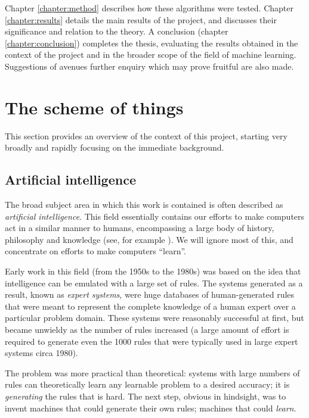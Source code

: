 Chapter \ref{chapter:method} describes how these algorithms were
tested.  Chapter \ref{chapter:results} details the main results of the
project, and discusses their significance and relation to the theory.
A conclusion (chapter \ref{chapter:conclusion}) completes the thesis, 
evaluating the results obtained in the context of the project and in
the broader scope of the field of machine learning.  Suggestions of
avenues further enquiry which may prove fruitful are also made.

\section{The scheme of things}

This section provides an overview of the context of this project,
starting very broadly and rapidly focusing on the immediate
background. 


\subsection{Artificial intelligence}

The broad subject area in which this work is contained is often
described as \emph{artificial intelligence}.  This field 
essentially contains our efforts to make computers act in a similar
manner to humans, encompassing a large body of history, philosophy and
knowledge (see, for example \cite{Penrose89}).  We will ignore most
of this, and concentrate on efforts to make computers ``learn''.

Early work in this field (from the 1950s to the 1980s) was based on
the idea that intelligence can be emulated with a large set of rules.
The systems generated as a result, known as \emph{expert systems},
were huge databases of human-generated rules that were meant to
represent the complete knowledge of a human expert over a particular
problem domain.  These systems were reasonably successful at first,
but became unwieldy as the number of rules increased (a large amount
of effort is required to generate even the 1000 rules that were
typically used in large expert systems circa 1980). 

The problem was more practical than theoretical: systems with large
numbers of rules can theoretically learn any learnable problem to a
desired accuracy; it is \emph{generating} the rules that is hard.  The
next step, obvious in hindsight, was to invent machines that could
generate their own rules; machines that could \emph{learn}.



